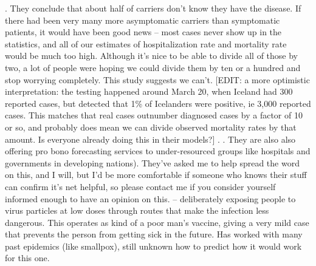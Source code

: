 \begin{xmlentries}
\begin{xmlentriescontent}
{{. They conclude that about half of carriers don’t know they have the disease. If there had been very many more asymptomatic carriers than symptomatic patients, it would have been good news – most cases never show up in the statistics, and all of our estimates of hospitalization rate and mortality rate would be much too high. Although it’s nice to be able to divide all of those by two, a lot of people were hoping we could divide them by ten or a hundred and stop worrying completely. This study suggests we can’t. [EDIT:  a more optimistic interpretation: the testing happened around March 20, when Iceland had 300 reported cases, but detected that 1\% of Icelanders were positive, ie 3,000 reported cases. This matches  that real cases outnumber diagnosed cases by a factor of 10 or so, and probably does mean we can divide observed mortality rates by that amount. Is everyone already doing this in their models?]
.
. They are also also offering pro bono forecasting services to under-resourced groups like hospitals and governments in developing nations). They’ve asked me to help spread the word on this, and I will, but I’d be more comfortable if someone who knows their stuff can confirm it’s net helpful, so please contact me if you consider yourself informed enough to have an opinion on this.
 – deliberately exposing people to virus particles at low doses through routes that make the infection less dangerous. This operates as kind of a poor man’s vaccine, giving a very mild case that prevents the person from getting sick in the future. Has worked with many past epidemics (like smallpox), still unknown how to predict how it would work for this one.
}}
\end{xmlentriescontent}
\end{xmlentries}
